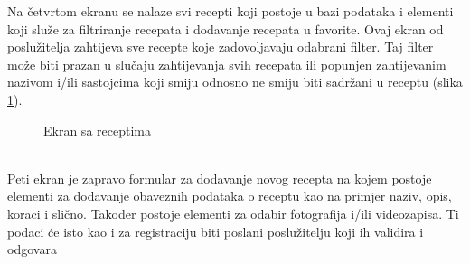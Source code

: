 \documentclass[times, utf8, zavrsni]{fer}
\begin{document}
Na četvrtom ekranu se nalaze svi recepti koji postoje u bazi podataka i elementi koji služe za
filtriranje recepata i dodavanje recepata u favorite.
Ovaj ekran od poslužitelja zahtijeva sve recepte koje zadovoljavaju odabrani
filter. Taj filter može biti prazan u slučaju zahtijevanja svih recepata ili popunjen zahtijevanim nazivom
i/ili sastojcima koji smiju odnosno ne smiju biti sadržani u receptu (slika \ref*{fig:All recipes}).
\begin{figure}[h]
      \centering
      \caption{Ekran sa receptima}
      \label{fig:All recipes}
\end{figure}\\
Peti ekran je zapravo formular za dodavanje novog recepta na kojem postoje elementi za dodavanje
obaveznih podataka o receptu kao na primjer naziv, opis, koraci i slično. Također postoje elementi za odabir fotografija i/ili
videozapisa. Ti podaci će isto kao i za registraciju biti poslani poslužitelju koji ih validira i odgovara
\end{document}
